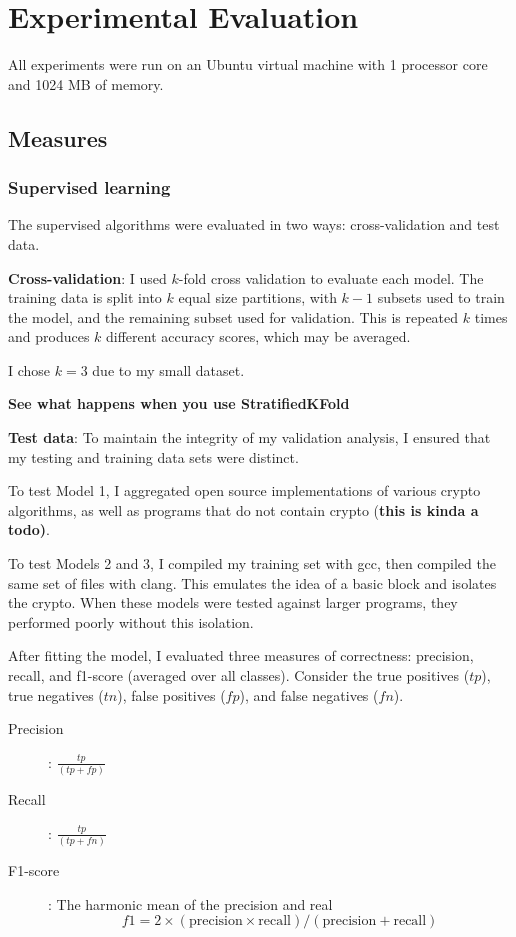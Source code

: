 \chapter{Experimental Evaluation}
All experiments were run on an Ubuntu virtual machine with 1 processor core and 1024 MB of memory.

\section{Measures}
\subsection{Supervised learning}
The supervised algorithms were evaluated in two ways: cross-validation and test data.

\textbf{Cross-validation}: I used $k$-fold cross validation to evaluate each model.  The training data is split into $k$ equal size partitions, with $k-1$ subsets used to train the model, and the remaining subset used for validation.  This is repeated $k$ times and produces $k$ different accuracy scores, which may be averaged.

I chose $k=3$ due to my small dataset.

\textbf{See what happens when you use StratifiedKFold}

\textbf{Test data}:  To maintain the integrity of my validation analysis, I ensured that my testing and training data sets were distinct.

To test Model 1, I aggregated open source implementations of various crypto algorithms, as well as programs that do not contain crypto (\textbf{this is kinda a todo)}.

To test Models 2 and 3, I compiled my training set with gcc, then compiled the same set of files with clang.  This emulates the idea of a basic block and isolates the crypto.  When these models were tested against larger programs, they performed poorly without this isolation.

After fitting the model, I evaluated three measures of correctness: precision, recall, and f1-score (averaged over all classes).  Consider the true positives ($tp$), true negatives ($tn$), false positives ($fp$), and false negatives ($fn$).
\begin{description}
\item[Precision]: $\frac{tp}{(tp+fp)}$
\item[Recall]: $\frac{tp}{(tp+fn)}$
\item[F1-score]: The harmonic mean of the precision and real $$f1=2\times(\text{precision}\times\text{recall})/ (\text{precision}+\text{recall})$$
\end{description}

